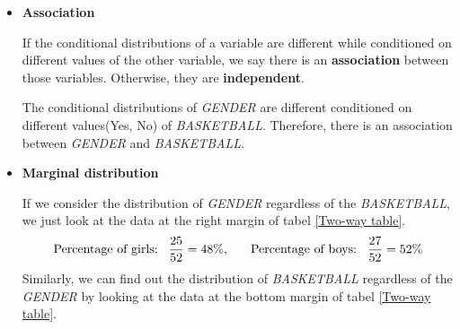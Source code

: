 \documentclass[a4paper, 12pt,twoside]{book}
\begin{document}
\begin{itemize}
\begin{itemize}
\begin{itemize}
\begin{table}[H]
\begin{tabular}{ccc}
 \vspace{0.2cm}
 Yes&$\frac{21}{26} \approx 81\%$&$\frac{5}{26} \approx 19\%$\\
 \vspace{0.2cm}
  No&$\frac{6}{26} \approx 23\%$&$\frac{20}{26} \approx 77\%$\\
 \hline 
 \end{tabular}
 \caption{Conditional distribution}
 \label{ConditionalDistribution}
 \end{table}
 
Table \ref{ConditionalDistribution} gives the conditional distribution of \textit{GENDER} conditioned on different different values of \textit{BASKETBALL}. For example, the conditional distribution of \textit{GENDER} among those who play basketball is that: about $81\%$ of them are boys, $19\%$ are girls.
\vspace{0.6cm} 

If a student plays basketball, this students is more likely to be a boy than a girl. Clearly, there is some association between \textit{GENDER} and \textit{BASKETBALL}.
\vspace{0.6cm} 

\item \textbf{Association}
\vspace{0.6cm}

If the conditional distributions of a variable are different while conditioned on different values of the other variable, we say there is an \textbf{association} between those variables. Otherwise, they   are \textbf{independent}.
\vspace{0.6cm}

The conditional distributions of \textit{GENDER} are different conditioned on different values(Yes, No) of \textit{BASKETBALL}. Therefore, there is an association between \textit{GENDER} and \textit{BASKETBALL}.
\vspace{0.6cm}

\item \textbf{Marginal distribution}
\vspace{0.6cm}

If we consider the distribution of \textit{GENDER} regardless of the \textit{BASKETBALL}, we just look at the data at the right margin of tabel \ref{Two-way table}.
$$\text{Percentage of girls:}\hspace{0.3cm}\frac{25}{52} = 48\%,\hspace{0.6cm}\text{Percentage of boys:} \hspace{0.3cm} \frac{27}{52} = 52\%$$
Similarly, we can find out the distribution of \textit{BASKETBALL} regardless of the \textit{GENDER} by looking at the data at the bottom margin of tabel \ref{Two-way table}.
\vspace{0.6cm}


\end{itemize}
\end{itemize}
\end{itemize}
\end{document}
